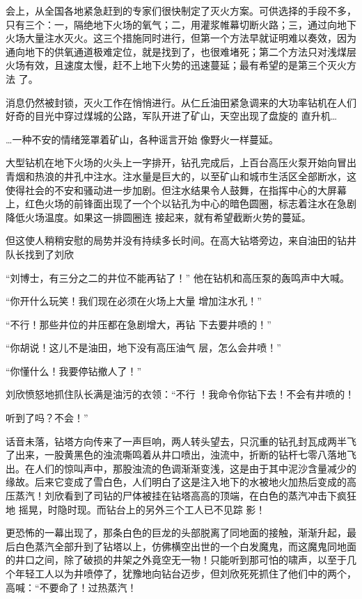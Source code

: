 \documentclass{article}
\begin{document}
会上，从全国各地紧急赶到的专家们很快制定了灭火方案。可供选择的手段不多，只有三个：一，隔绝地下火场的氧气；二，用灌浆帷幕切断火路；三，通过向地下火场大量注水灭火。这三个措施同时进行，但第一个方法早就证明难以奏效，因为通向地下的供氧通道极难定位，就是找到了，也很难堵死；第二个方法只对浅煤层火场有效，且速度太慢，赶不上地下火势的迅速蔓延；最有希望的是第三个灭火方法
了。 

消息仍然被封锁，灭火工作在悄悄进行。从仁丘油田紧急调来的大功率钻机在人们好奇的目光中穿过煤城的公路，军队开进了矿山，天空出现了盘旋的
直升机… 

\newpage

…一种不安的情绪笼罩着矿山，各种谣言开始
像野火一样蔓延。 

大型钻机在地下火场的火头上一字排开，钻孔完成后，上百台高压火泵开始向冒出青烟和热浪的井孔中注水。注水量是巨大的，以至矿山和城市生活区全部断水，这使得社会的不安和骚动进一步加剧。但注水结果令人鼓舞，在指挥中心的大屏幕上，红色火场的前锋面出现了一个个以钻孔为中心的暗色圆圈，标志着注水在急剧降低火场温度。如果这一排圆圈连
接起来，就有希望截断火势的蔓延。 

但这使人稍稍安慰的局势并没有持续多长时间。在高大钻塔旁边，来自油田的钻井队长找到了刘欣

“刘博士，有三分之二的井位不能再钻了！”
他在钻机和高压泵的轰鸣声中大喊。 

“你开什么玩笑！我们现在必须在火场上大量
增加注水孔！” 

\newpage

“不行！那些井位的井压都在急剧增大，再钻
下去要井喷的！” 

“你胡说！这儿不是油田，地下没有高压油气
层，怎么会井喷！” 


“你懂什么！我要停钻撤人了！” 

刘欣愤怒地抓住队长满是油污的衣领：“不行
！我命令你钻下去！不会有井喷的！ 


听到了吗？不会！” 

话音未落，钻塔方向传来了一声巨响，两人转头望去，只沉重的钻孔封瓦成两半飞了出来，一股黄黑色的浊流嘶鸣着从井口喷出，浊流中，折断的钻杆七零八落地飞出。在人们的惊叫声中，那股浊流的色调渐渐变浅，这是由于其中泥沙含量减少的缘故。后来它变成了雪白色，人们明白了这是注入地下的水被地火加热后变成的高压蒸汽！刘欣看到了司钻的尸体被挂在钻塔高高的顶端，在白色的蒸汽冲击下疯狂地
\newpage
摇晃，时隐时现。而钻台上的另外三个工人已不见踪
影！ 

更恐怖的一幕出现了，那条白色的巨龙的头部脱离了同地面的接触，渐渐升起，最后白色蒸汽全部升到了钻塔以上，仿佛横空出世的一个白发魔鬼，而这魔鬼同地面的井口之间，除了破损的井架之外竟空无一物！只能听到那可怕的啸声，以至于几个年轻工人以为井喷停了，犹豫地向钻台迈步，但刘欣死死抓住了他们中的两个，高喊：“不要命了！过热蒸汽！
\end{document}
